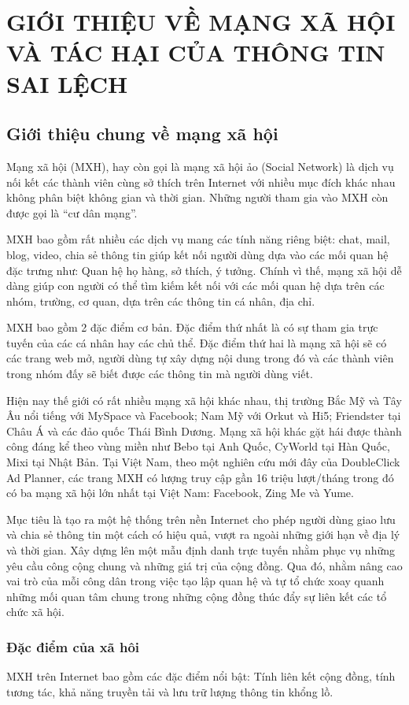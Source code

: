 \chapter{GIỚI THIỆU VỀ MẠNG XÃ HỘI VÀ TÁC HẠI CỦA THÔNG TIN SAI LỆCH }

\section{Giới thiệu chung về mạng xã hội}
Mạng xã hội (MXH), hay còn gọi là mạng xã hội ảo (Social Network) là dịch vụ nối kết các thành viên cùng sở thích trên Internet với nhiều mục đích khác nhau không phân biệt không gian và thời gian. Những người tham gia vào MXH còn được gọi là “cư dân mạng”. 

MXH bao gồm rất nhiều các dịch vụ mang các tính năng riêng biệt: chat, mail, blog, video, chia sẻ thông tin giúp kết nối người dùng dựa vào các mối quan hệ đặc trưng như: Quan hệ họ hàng, sở thích, ý tưởng. Chính vì thế, mạng xã hội dễ dàng giúp con người có thể tìm kiếm kết nối với các mối quan hệ dựa trên các nhóm, trường, cơ quan, dựa trên các thông tin cá nhân, địa chỉ. 

MXH bao gồm 2 đặc điểm cơ bản. Đặc điểm thứ nhất là có sự tham gia trực tuyến của các cá nhân hay các chủ thể. Đặc điểm thứ hai là mạng xã hội sẽ có các trang web mở, người dùng tự xây dựng nội dung trong đó và các thành viên trong nhóm đấy sẽ biết được các thông tin mà người dùng viết.

Hiện nay thế giới có rất nhiều mạng xã hội khác nhau, thị trường Bắc Mỹ và Tây Âu nổi tiếng với MySpace và Facebook; Nam Mỹ với Orkut và Hi5; Friendster tại Châu Á và các đảo quốc Thái Bình Dương. Mạng xã hội khác gặt hái được thành công đáng kể theo vùng miền như Bebo tại Anh Quốc, CyWorld tại Hàn Quốc, Mixi tại Nhật Bản. Tại Việt Nam, theo một nghiên cứu mới đây của DoubleClick Ad Planner, các trang MXH có lượng truy cập gần 16 triệu lượt/tháng trong đó có ba mạng xã hội lớn nhất tại Việt Nam: Facebook, Zing Me và Yume.

Mục tiêu là tạo ra một hệ thống trên nền Internet cho phép người dùng giao lưu và chia sẻ thông tin một cách có hiệu quả, vượt ra ngoài những giới hạn về địa lý và thời gian. Xây dựng lên một mẫu định danh trực tuyến nhằm phục vụ những yêu cầu công cộng chung và những giá trị của cộng đồng. Qua đó, nhằm nâng cao vai trò của mỗi công dân trong việc tạo lập quan hệ và tự tổ chức xoay quanh những mối quan tâm chung trong những cộng đồng thúc đẩy sự liên kết các tổ chức xã hội.
	\subsection{Đặc điểm của xã hôi}
	MXH trên Internet bao gồm các đặc điểm nổi bật: Tính liên kết cộng đồng, tính tương tác, khả năng truyền tải và lưu trữ lượng thông tin khổng lồ.
